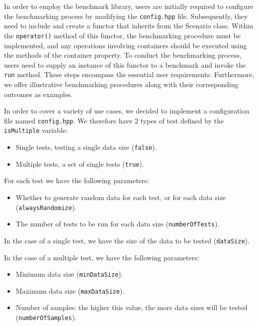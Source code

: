 \documentclass[conference]{IEEEtran} \IEEEoverridecommandlockouts
\def\code#1{\texttt{#1}}
\begin{document}
In order to employ the benchmark library, users are initially required
to configure the benchmarking process by modifying the \code{config.hpp}
file. Subsequently, they need to include and create a functor that
inherits from the Scenario class. Within the \code{operator()} method of
this functor, the benchmarking procedure must be implemented, and any
operations involving containers should be executed using the methods
of the container property. To conduct the benchmarking process, users
need to supply an instance of this functor to a benchmark and invoke
the \code{run} method. These steps encompass the essential user
requirements. Furthermore, we offer illustrative benchmarking
procedures along with their corresponding outcomes as examples.

In order to cover a variety of use cases, we decided to
implement a configuration file named \code{config.hpp}. We therefore
have 2 types of test defined by the \code{isMultiple} variable:
\begin{itemize}
	\item Single tests, testing a single data size (\code{false}).
	\item Multiple tests, a set of single tests (\code{true}).
\end{itemize}

For each test we have the following parameters:
\begin{itemize}
	\item Whether to generate random data for each test, or for
          each data size (\code{alwaysRandomize}).
	\item The number of tests to be run for each data size
          (\code{numberOfTests}).
\end{itemize}

In the case of a single test, we have the size of the data to be
tested (\code{dataSize}).

In the case of a multiple test, we have the following parameters:
\begin{itemize}
	\item Minimum data size (\code{minDataSize}).
	\item Maximum data size (\code{maxDataSize}).
	\item Number of samples: the higher this value, the more data
          sizes will be tested (\code{numberOfSamples}).
\end{itemize}
\end{document}
